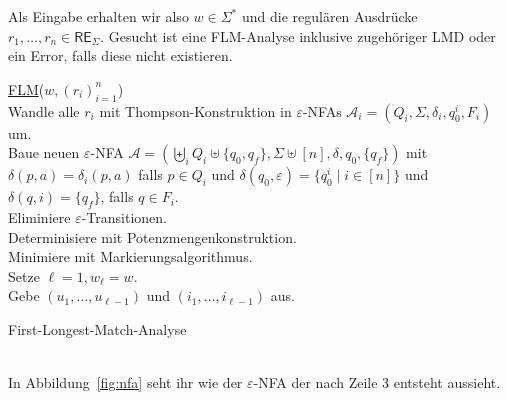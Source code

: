 \documentclass[11pt, a4paper]{article}
\theoremstyle{definition}
\theoremstyle{plain}
\numberwithin{equation}{section}
\begin{document}
Als Eingabe erhalten wir also $w \in \Sigma^\ast$ und die regulären Ausdrücke $r_1, \ldots, r_n \in \mathsf{RE}_\Sigma$. Gesucht ist eine FLM-Analyse inklusive zugehöriger LMD oder ein Error, falls diese nicht existieren.
\begin{algorithm}
	\underline{FLM}{($w, (r_i)_{i=1}^n$)}\\
	Wandle alle $r_i$ mit Thompson-Konstruktion in $\varepsilon$-NFAs $\mathcal{A}_i = (Q_i, \Sigma, \delta_i, q_0^i, F_i)$ um.\\
	Baue neuen $\varepsilon$-NFA $\mathcal{A} = (\biguplus_i Q_i \uplus \{q_0, q_f\}, \Sigma \uplus [n], \delta, q_0, \{q_f\})$ mit $\delta(p, a) = \delta_i(p, a)$ falls $p \in Q_i$ und $\delta(q_0, \varepsilon) = \{q_0^i \mid i \in [n]\}$ und $\delta(q, i) = \{q_f\}$, falls $q \in F_i$.\\
	Eliminiere $\varepsilon$-Transitionen.\\
	Determinisiere mit Potenzmengenkonstruktion.\\
	Minimiere mit Markierungsalgorithmus.\\
	Setze $\ell = 1, w_\ell = w$.\\
	Gebe $(u_1, \ldots, u_{\ell-1})$ und $(i_1, \ldots, i_{\ell-1})$ aus.
	\caption{First-Longest-Match-Analyse}
	\label{alg:algorithm}
\end{algorithm}\\
In Abbildung~\ref{fig:nfa} seht ihr wie der $\varepsilon$-NFA der nach Zeile 3 entsteht aussieht.
\end{document}
